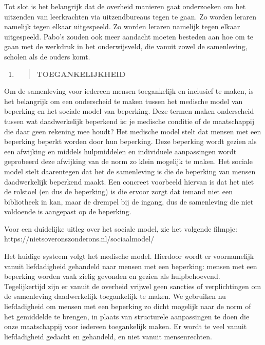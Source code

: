 Tot slot is het belangrijk dat de overheid manieren gaat onderzoeken om
het uitzenden van leerkrachten via uitzendbureaus tegen te gaan. Zo
worden leraren namelijk tegen elkaar uitgespeeld. Zo worden leraren
namelijk tegen elkaar uitgespeeld. Pabo's zouden ook meer aandacht
moeten besteden aan hoe om te gaan met de werkdruk in het onderwijsveld,
die vanuit zowel de samenleving, scholen als de ouders komt.

\begin{enumerate}
\def\labelenumi{\arabic{enumi}.}
\setcounter{enumi}{11}
\item
  \begin{quote}
  \textbf{TOEGANKELIJKHEID}
  \end{quote}
\end{enumerate}

Om de samenleving voor iedereen mensen toegankelijk en inclusief te
maken, is het belangrijk om een onderscheid te maken tussen het medische
model van beperking en het sociale model van beperking. Deze termen
maken onderscheid tussen wat daadwerkelijk beperkend is: je medische
conditie of de maatschappij die daar geen rekening mee houdt? Het
medische model stelt dat mensen met een beperking beperkt worden door
hun beperking. Deze beperking wordt gezien als een afwijking en middels
hulpmiddelen en individuele aanpassingen wordt geprobeerd deze afwijking
van de norm zo klein mogelijk te maken. Het sociale model stelt
daarentegen dat het de samenleving is die de beperking van mensen
daadwerkelijk beperkend maakt. Een concreet voorbeeld hiervan is dat het
niet de rolstoel (en dus de beperking) is die ervoor zorgt dat iemand
niet een bibliotheek in kan, maar de drempel bij de ingang, dus de
samenleving die niet voldoende is aangepast op de beperking.

Voor een duidelijke uitleg over het sociale model, zie het volgende
filmpje: https://nietsoveronszonderons.nl/sociaalmodel/

Het huidige systeem volgt het medische model. Hierdoor wordt er
voornamelijk vanuit liefdadigheid gehandeld naar mensen met een
beperking: mensen met een beperking worden vaak zielig gevonden en
gezien als hulpbehoevend. Tegelijkertijd zijn er vanuit de overheid
vrijwel geen sancties of verplichtingen om de samenleving daadwerkelijk
toegankelijk te maken. We gebruiken nu liefdadigheid om mensen met een
beperking zo dicht mogelijk naar de norm of het gemiddelde te brengen,
in plaats van structurele aanpassingen te doen die onze maatschappij
voor iedereen toegankelijk maken. Er wordt te veel vanuit liefdadigheid
gedacht en gehandeld, en niet vanuit mensenrechten.

